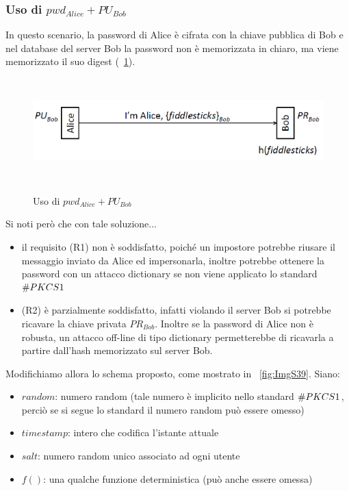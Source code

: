 \subsubsection{Uso di $pwd_{Alice} + PU_{Bob}$}
In questo scenario, la password di Alice è cifrata con la chiave pubblica di Bob e nel database del server Bob la password non è memorizzata in chiaro, ma viene memorizzato il suo digest (\figurename~\ref{fig:ImgS37}).
\begin{figure}[htbp]
	\centering%
	\subfigure%
	{\includegraphics[height=4cm, width=12cm, keepaspectratio]{Immagini/autenticazione/ImgS37.png}}
	\caption{Uso di $pwd_{Alice} + PU_{Bob}$\label{fig:ImgS37}} 	
\end{figure}
Si noti però che con tale soluzione...
\begin{itemize}
	\item il requisito (R1) non è soddisfatto, poiché un impostore potrebbe riusare il messaggio inviato da Alice ed
	impersonarla, inoltre potrebbe ottenere la password con un attacco dictionary se non viene applicato lo standard $\symbol{35}PKCS1$
	\item (R2) è parzialmente soddisfatto, infatti violando il server Bob si potrebbe ricavare la chiave privata $PR_{Bob}$. Inoltre se la password di Alice non è robusta, un attacco off-line di tipo dictionary permetterebbe di ricavarla a partire dall'hash memorizzato sul server Bob.
\end{itemize}
Modifichiamo allora lo schema proposto, come mostrato in \figurename~\ref{fig:ImgS39}. Siano:
\begin{itemize}
	\item $random$: numero random (tale numero è implicito nello standard $\symbol{35}PKCS1$, perciò se si segue lo standard il numero random può essere omesso)
	\item $timestamp$: intero che codifica l'istante attuale
	\item $salt$: numero random unico associato ad ogni utente
	\item $f()$: una qualche funzione deterministica (può anche essere omessa)
\end{itemize} 
